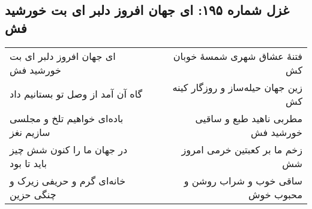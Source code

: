 \begin{center}
\section*{غزل شماره ۱۹۵: ای جهان افروز دلبر ای بت خورشید فش}
\label{sec:195}
\begin{longtable}{l p{0.5cm} r}
ای جهان افروز دلبر ای بت خورشید فش
&&
فتنهٔ عشاق شهری شمسهٔ خوبان کش
\\
گاه آن آمد از وصل تو بستانیم داد
&&
زین جهان حیله‌ساز و روزگار کینه کش
\\
باده‌ای خواهیم تلخ و مجلسی سازیم نغز
&&
مطربی ناهید طبع و ساقیی خورشید فش
\\
در جهان ما را کنون شش چیز باید تا بود
&&
زخم ما بر کعبتین خرمی امروز شش
\\
خانه‌ای گرم و حریفی زیرک و چنگی حزین
&&
ساقی خوب و شراب روشن و محبوب خوش
\\
\end{longtable}
\end{center}
